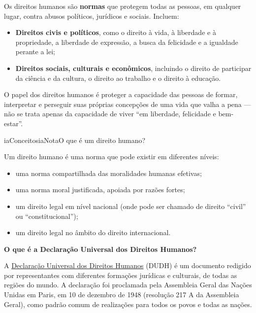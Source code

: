 \documentclass[
  11pt,
]{article}
\providecommand{\tightlist}{%
  \setlength{\itemsep}{0pt}\setlength{\parskip}{0pt}}
\newenvironment{nota}[1][Nota]{\begin{iabox}{iaConceitos}{iaNota}{#1}}{\end{iabox}}
\begin{document}
Os direitos humanos são \textbf{normas} que protegem todas as pessoas,
em qualquer lugar, contra abusos políticos, jurídicos e sociais.
Incluem:

\begin{itemize}
\tightlist
\item
  \textbf{Direitos civis e políticos}, como o direito à vida, à
  liberdade e à propriedade, a liberdade de expressão, a busca da
  felicidade e a igualdade perante a lei;
\item
  \textbf{Direitos sociais, culturais e econômicos}, incluindo o direito
  de participar da ciência e da cultura, o direito ao trabalho e o
  direito à educação.
\end{itemize}

O papel dos direitos humanos é proteger a capacidade das pessoas de
formar, interpretar e perseguir suas próprias concepções de uma vida que
valha a pena --- não se trata apenas da capacidade de viver ``em
liberdade, felicidade e bem-estar''.

\begin{nota}[O que é um direito humano?]

Um direito humano é uma norma que pode existir em diferentes níveis:

\begin{itemize}
\tightlist
\item
  uma norma compartilhada das moralidades humanas efetivas;
\item
  uma norma moral justificada, apoiada por razões fortes;
\item
  um direito legal em nível nacional (onde pode ser chamado de direito
  ``civil'' ou ``constitucional'');
\item
  um direito legal no âmbito do direito internacional.
\end{itemize}

\textbf{O que é a Declaração Universal dos Direitos Humanos?}

A
\href{https://www.un.org/en/about-us/universal-declaration-of-human-rights}{Declaração
Universal dos Direitos Humanos} (DUDH) é um documento redigido por
representantes com diferentes formações jurídicas e culturais, de todas
as regiões do mundo. A declaração foi proclamada pela Assembleia Geral
das Nações Unidas em Paris, em 10 de dezembro de 1948 (resolução 217 A
da Assembleia Geral), como padrão comum de realizações para todos os
povos e todas as nações.

\end{nota}
\end{document}
